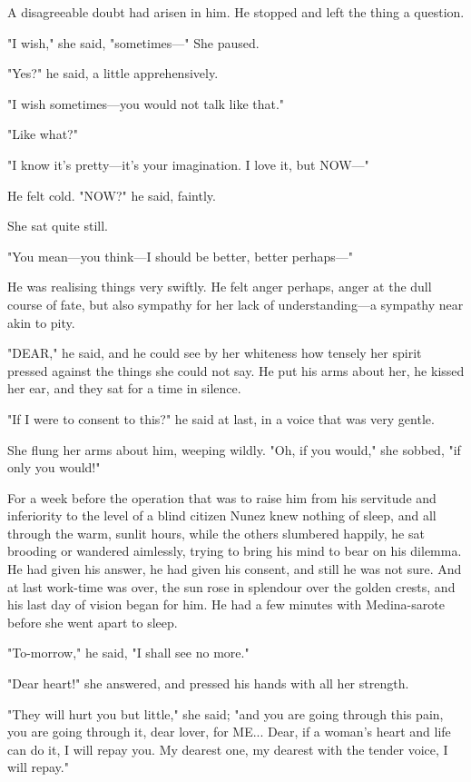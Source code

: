 \documentclass[courier]{sffms}
\begin{document}
A disagreeable doubt had arisen in him. He stopped and left the thing
a question.

"I wish," she said, "sometimes---" She paused.

"Yes?" he said, a little apprehensively.

"I wish sometimes---you would not talk like that."

"Like what?"

"I know it's pretty---it's your imagination. I love it, but NOW---"

He felt cold. "NOW?" he said, faintly.

She sat quite still.

"You mean---you think---I should be better, better perhaps---"

He was realising things very swiftly. He felt anger perhaps, anger at
the dull course of fate, but also sympathy for her lack of
understanding---a sympathy near akin to pity.

"DEAR," he said, and he could see by her whiteness how tensely her
spirit pressed against the things she could not say. He put his arms
about her, he kissed her ear, and they sat for a time in silence.

"If I were to consent to this?" he said at last, in a voice that was
very gentle.

She flung her arms about him, weeping wildly. "Oh, if you would," she
sobbed, "if only you would!"

For a week before the operation that was to raise him from his
servitude and inferiority to the level of a blind citizen Nunez knew
nothing of sleep, and all through the warm, sunlit hours, while the
others slumbered happily, he sat brooding or wandered aimlessly,
trying to bring his mind to bear on his dilemma.  He had given his
answer, he had given his consent, and still he was not sure.  And at
last work-time was over, the sun rose in splendour over the golden
crests, and his last day of vision began for him. He had a few minutes
with Medina-sarote before she went apart to sleep.

"To-morrow," he said, "I shall see no more."

"Dear heart!" she answered, and pressed his hands with all her
strength.

"They will hurt you but little," she said; "and you are going through
this pain, you are going through it, dear lover, for ME... Dear,
if a woman's heart and life can do it, I will repay you. My dearest
one, my dearest with the tender voice, I will repay."
\end{document}
